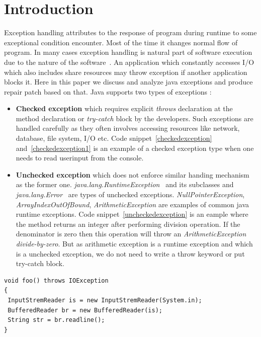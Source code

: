 

\chapter{Introduction}
\label{chapter:introduction}

Exception handling attributes to the response of program during runtime to some
exceptional condition encounter. Most of the time it changes normal flow of
program. In many cases exception handling is natural part of software execution
due to the nature of the software~\cite{JavaException}.
An application which constantly accesses I/O which also includes share resources
may throw exception if another application blocks it.
Here in this paper we discuss and analyze java exceptions and produce repair
patch based on that. Java supports two types of exceptions :

\begin{itemize}
  
  \item \textbf{Checked exception} which requires explicit \emph{throws}
  declaration at the method declaration or \emph{try-catch} block by the
  developers. Such exceptions are handled carefully as they often involves
  accessing resources like network, database, file system, I/O etc.
  Code snippet~\ref{checkedexception} and~\ref{checkedexception1} is an example of a
  checked exception type when one needs to read userinput from the console.
  
  \item \textbf{Unchecked exception} which does not enforce similar handing
  mechanism as the former one.
  \emph{java.lang.RuntimeException}~\cite{RuntimeException} and its subclasses
  and \emph{java.lang.Error}~\cite{JavaError} are types of unchecked exceptions.
  \emph{NullPointerException}, \emph{ArrayIndexOutOfBound},
  \emph{ArithmeticException} are examples of common java runtime exceptions.
  Code snippet~\ref{uncheckedexception} is an eample where the method returns an
  integer after performing division operation. If the denominator is zero then
  this operation will throw an \emph{ArithmeticException} \emph{divide-by-zero}.
  But as arithmetic exception is a runtime exception and which is a unchecked
  exception, we do not need to write a throw keyword or put try-catch block.
  
\end{itemize}

\onehalfspacing
\lstset{language=Java, caption=Example 1 of java checked exception,
label=checkedexception}
\begin{lstlisting}
void foo() throws IOException
{
 InputStremReader is = new InputStremReader(System.in);
 BufferedReader br = new BufferedReader(is);
 String str = br.readline();
}
\end{lstlisting}



